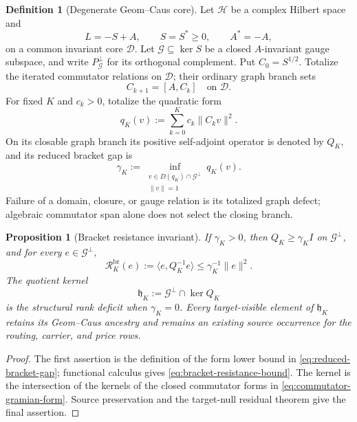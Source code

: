 \documentclass[11pt]{article}
\numberwithin{section}{part}
\theoremstyle{plain}
\newtheorem{proposition}[proposition]{Proposition}
\theoremstyle{definition}
\newtheorem{definition}[definition]{Definition}
\theoremstyle{remark}
\newcommand{\Hspace}{\mathcal H}
\begin{document}
\begin{definition}[Degenerate Geom--Caus core]
\label{def:degenerate-geom-caus-core}
Let \(\Hspace\) be a complex Hilbert space and
\[
 L=-S+A,
 \qquad S=S^*\ge0,
 \qquad A^*=-A,
\]
on a common invariant core \(\mathcal D\).  Let \(\mathcal G\subseteq\ker S\)
be a closed \(A\)-invariant gauge subspace, and write
\(P_{\mathcal G}^\perp\) for its orthogonal complement.  Put
\(C_0=S^{1/2}\).  Totalize the iterated commutator relations on
\(\mathcal D\); their ordinary graph branch sets
\[
 C_{k+1}=[A,C_k]\quad\text{on }\mathcal D.
\]
For fixed \(K\) and \(c_k>0\), totalize the quadratic form
\begin{equation}
 \label{eq:commutator-gramian-form}
 q_K(v):=\sum_{k=0}^{K}c_k\|C_kv\|^2.
\end{equation}
On its closable graph branch its positive self-adjoint operator is denoted by \(Q_K\), and
its reduced bracket gap is
\begin{equation}
 \label{eq:reduced-bracket-gap}
 \gamma_K
 :=\inf_{\substack{v\in D(q_K)\cap\mathcal G^\perp\\\|v\|=1}}q_K(v).
\end{equation}
Failure of a domain, closure, or gauge relation is its totalized graph defect;
algebraic commutator span alone does not select the closing branch.
\end{definition}

\begin{proposition}[Bracket resistance invariant]
\label{prop:bracket-resistance-invariant}
If \(\gamma_K>0\), then
\(Q_K\ge\gamma_K I\) on \(\mathcal G^\perp\), and for every
\(e\in\mathcal G^\perp\),
\begin{equation}
 \label{eq:bracket-resistance-bound}
 \mathcal R_K^{\mathrm{br}}(e)
 :=\langle e,Q_K^{-1}e\rangle
 \le\gamma_K^{-1}\|e\|^2.
\end{equation}
The quotient kernel
\[
 \mathfrak h_K:=\mathcal G^\perp\cap\ker Q_K
\]
is the structural rank deficit when \(\gamma_K=0\).  Every target-visible
element of \(\mathfrak h_K\) retains its Geom--Caus ancestry and remains an
existing source occurrence for the routing, carrier, and price rows.
\end{proposition}

\begin{proof}
The first assertion is the definition of the form lower bound in
\eqref{eq:reduced-bracket-gap}; functional calculus gives
\eqref{eq:bracket-resistance-bound}.  The kernel is the intersection of the
kernels of the closed commutator forms in
\eqref{eq:commutator-gramian-form}.  Source preservation and the target-null
residual theorem give the final assertion.
\end{proof}
\end{document}
